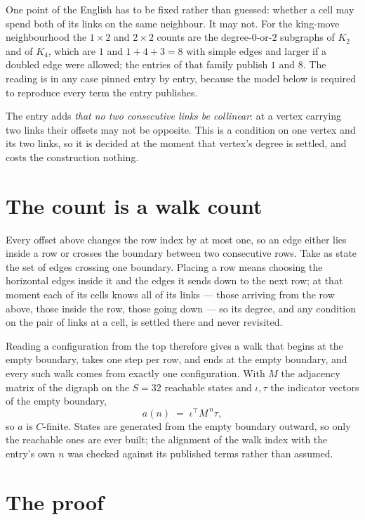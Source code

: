 \documentclass[11pt,a4paper]{article}
\theoremstyle{plain}
\theoremstyle{definition}
\begin{document}
One point of the English has to be fixed rather than guessed: whether a cell may spend both of
its links on the same neighbour. It may not. For the king-move neighbourhood the $1\times2$
and $2\times2$ counts are the degree-$0$-or-$2$ subgraphs of $K_2$ and of $K_4$, which are $1$
and $1+4+3=8$ with simple edges and larger if a doubled edge were allowed; the entries of that
family publish $1$ and $8$. The reading is in any case pinned entry by entry, because the
model below is required to reproduce every term the entry publishes.

The entry adds \emph{that no two consecutive links be collinear}: at a vertex carrying two
links their offsets may not be opposite. This is a condition on one vertex and its two links,
so it is decided at the moment that vertex's degree is settled, and costs the construction
nothing.

\section{The count is a walk count}

Every offset above changes the row index by at most one, so an edge either lies inside a row
or crosses the boundary between two consecutive rows. Take as state the set of edges crossing
one boundary. Placing a row means choosing the horizontal edges inside it and the edges it
sends down to the next row; at that moment each of its cells knows all of its links --- those
arriving from the row above, those inside the row, those going down --- so its degree, and any
condition on the pair of links at a cell, is settled there and never revisited.

Reading a configuration from the top therefore gives a walk that begins at the empty boundary,
takes one step per row, and ends at the empty boundary, and every such walk comes from exactly
one configuration. With $M$ the adjacency matrix of the digraph on the $S=32$ reachable
states and $\iota,\tau$ the indicator vectors of the empty boundary,
\[
a(n)\;=\;\iota^{\!\top}M^{\,n}\tau ,
\]
so $a$ is $C$-finite. States are generated from the empty boundary outward, so only the
reachable ones are ever built; the alignment of the walk index with the entry's own $n$ was
checked against its published terms rather than assumed.

\section{The proof}
\end{document}
